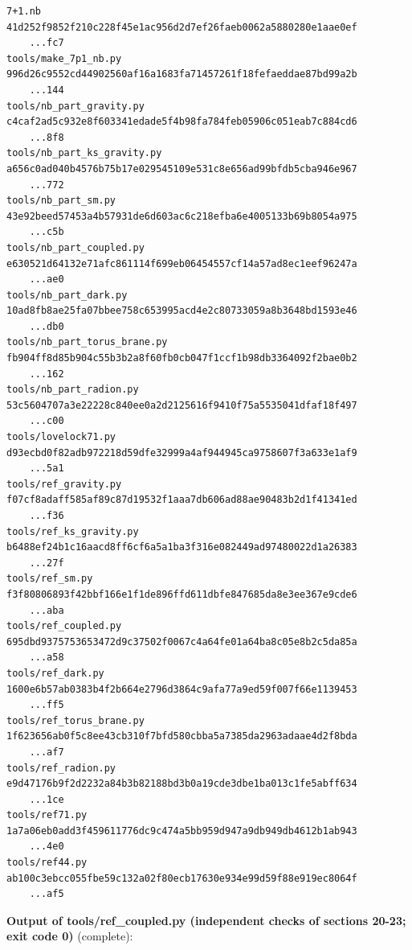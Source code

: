 \documentclass[10pt,a4paper]{article}
\begin{document}
\begin{Verbatim}[fontsize=\small,frame=single,framesep=2mm]
7+1.nb                             41d252f9852f210c228f45e1ac956d2d7ef26faeb0062a5880280e1aae0ef
    ...fc7
tools/make_7p1_nb.py               996d26c9552cd44902560af16a1683fa71457261f18fefaeddae87bd99a2b
    ...144
tools/nb_part_gravity.py           c4caf2ad5c932e8f603341edade5f4b98fa784feb05906c051eab7c884cd6
    ...8f8
tools/nb_part_ks_gravity.py        a656c0ad040b4576b75b17e029545109e531c8e656ad99bfdb5cba946e967
    ...772
tools/nb_part_sm.py                43e92beed57453a4b57931de6d603ac6c218efba6e4005133b69b8054a975
    ...c5b
tools/nb_part_coupled.py           e630521d64132e71afc861114f699eb06454557cf14a57ad8ec1eef96247a
    ...ae0
tools/nb_part_dark.py              10ad8fb8ae25fa07bbee758c653995acd4e2c80733059a8b3648bd1593e46
    ...db0
tools/nb_part_torus_brane.py       fb904ff8d85b904c55b3b2a8f60fb0cb047f1ccf1b98db3364092f2bae0b2
    ...162
tools/nb_part_radion.py            53c5604707a3e22228c840ee0a2d2125616f9410f75a5535041dfaf18f497
    ...c00
tools/lovelock71.py                d93ecbd0f82adb972218d59dfe32999a4af944945ca9758607f3a633e1af9
    ...5a1
tools/ref_gravity.py               f07cf8adaff585af89c87d19532f1aaa7db606ad88ae90483b2d1f41341ed
    ...f36
tools/ref_ks_gravity.py            b6488ef24b1c16aacd8ff6cf6a5a1ba3f316e082449ad97480022d1a26383
    ...27f
tools/ref_sm.py                    f3f80806893f42bbf166e1f1de896ffd611dbfe847685da8e3ee367e9cde6
    ...aba
tools/ref_coupled.py               695dbd9375753653472d9c37502f0067c4a64fe01a64ba8c05e8b2c5da85a
    ...a58
tools/ref_dark.py                  1600e6b57ab0383b4f2b664e2796d3864c9afa77a9ed59f007f66e1139453
    ...ff5
tools/ref_torus_brane.py           1f623656ab0f5c8ee43cb310f7bfd580cbba5a7385da2963adaae4d2f8bda
    ...af7
tools/ref_radion.py                e9d47176b9f2d2232a84b3b82188bd3b0a19cde3dbe1ba013c1fe5abff634
    ...1ce
tools/ref71.py                     1a7a06eb0add3f459611776dc9c474a5bb959d947a9db949db4612b1ab943
    ...4e0
tools/ref44.py                     ab100c3ebcc055fbe59c132a02f80ecb17630e934e99d59f88e919ec8064f
    ...af5
\end{Verbatim}
\textbf{Output of tools/ref\_coupled.py (independent checks of sections 20-23; exit code 0)} (complete):
\end{document}
